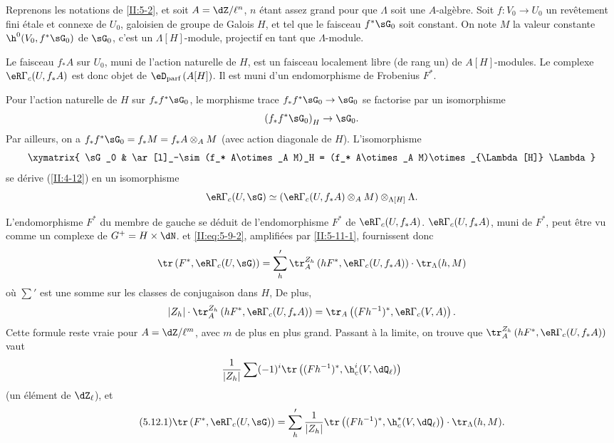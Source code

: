 Reprenons les notations de \ref{II:5-2}, et soit $A=\dZ/\ell^n$, $n$ étant 
assez grand pour que $\Lambda$ soit une $A$-algèbre. Soit $f:V_0\to U_0$ un 
revêtement fini étale et connexe de $U_0$, galoisien de groupe de Galois 
$H$, et tel que le faisceau $f^*\sG_0$ soit constant. On note $M$ la valeur 
constante $\h^0(V_0,f^*\sG_0)$ de $\sG_0$, c'est un $\Lambda[H]$-module, projectif en 
tant que $\Lambda$-module. 

Le faisceau $f_* A$ sur $U_0$, muni de l'action naturelle de $H$, est un 
faisceau localement libre (de rang un) de $A[H]$-modules. Le complexe 
$\eR\Gamma_c(U,f_* A)$ est donc objet de $\eD_\text{parf}\left(A[H]\right)$. Il 
est muni d'un endomorphisme de Frobenius $F^*$. 

Pour l'action naturelle de $H$ sur $f_* f^*\sG_0$, le morphisme trace 
$f_* f^*\sG_0\to\sG_0$ se factorise par un isomorphisme 
\[
  \left(f_* f^*\sG_0\right)_H \to \sG_0 \text{.}
\]
Par ailleurs, on a $f_* f^*\sG_0=f_* M=f_* A\otimes_A M$ (avec action diagonale de 
$H$). L'isomorphisme 
\[\xymatrix{
  \sG_0 
    & \ar[l]_-\sim (f_* A\otimes_A M)_H = (f_* A\otimes_A M)\otimes_{\Lambda[H]} \Lambda
}\]
se dérive (\ref{II:4-12}) en un isomorphisme 
\[
  \eR\Gamma_c(U,\sG) \simeq \left(\eR\Gamma_c(U,f_* A)\otimes_A M\right)\otimes_{\Lambda[H]} \Lambda \text{.}
\]

L'endomorphisme $F^*$ du membre de gauche se déduit de l'endomorphisme 
$F^*$ de $\eR\Gamma_c(U,f_* A)$.  
$\eR\Gamma_c(U,f_* A)$, muni de $F^*$, peut être vu comme un complexe de 
 $G^+=H\times \dN$.  
et \eqref{II:eq:5-9-2}, amplifiées par \ref{II:5-11-1}, fournissent donc 
\[
  \tr\left(F^*,\eR\Gamma_c(U,\sG)\right) = \sum_h' \tr_A^{Z_h}\left(h F^*,\eR\Gamma_c(U,f_* A)\right)\cdot \tr_\Lambda(h,M)
\]
où $\sum'$ est une somme sur les classes de conjugaison dans $H$, De plus, 
\[
  |Z_h|\cdot \tr_A^{Z_h}\left(h F^*,\eR\Gamma_c(U,f_* A)\right) = \tr_A\left((F h^{-1})^*,\eR\Gamma_c(V,A)\right) \text{.}
\]
Cette formule reste vraie pour $A=\dZ/\ell^m$, avec $m$ de plus en plus grand. 
Passant à la limite, on trouve que 
$\tr_A^{Z_h}\left(h F^*,\eR\Gamma_c(U,f_* A)\right)$ vaut 
\[
  \frac{1}{|Z_h|} \sum (-1)^i \tr\left((F h^{-1})^*,\h_c^i(V,\dQ_\ell)\right)
\]
(un élément de $\dZ_\ell$), et
\begin{equation*}\tag{5.12.1}\label{II:eq:5-12-1}
\tr\left(F^*,\eR\Gamma_c(U,\sG)\right) = \sum_h' \frac{1}{|Z_h|} \tr\left((F h^{-1})^*,\h_c^*(V,\dQ_\ell)\right)\cdot \tr_\Lambda(h,M) \text{.} 
\end{equation*}





